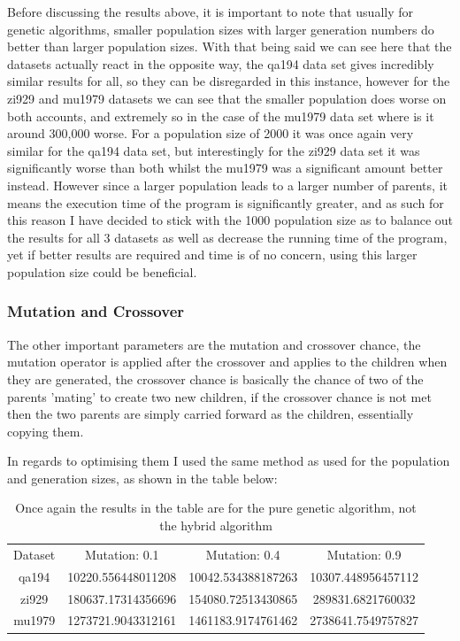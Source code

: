 \documentclass[11pt,a4paper,titlepage]{article}
\begin{document}
Before discussing the results above, it is important to note that usually for genetic algorithms, smaller population sizes with larger generation numbers do better than larger population sizes. With that being said we can see here that the datasets actually react in the opposite way, the qa194 data set gives incredibly similar results for all, so they can be disregarded in this instance, however for the zi929 and mu1979 datasets we can see that the smaller population does worse on both accounts, and extremely so in the case of the mu1979 data set where is it around 300,000 worse. For a population size of 2000 it was once again very similar for the qa194 data set, but interestingly for the zi929 data set it was significantly worse than both whilst the mu1979 was a significant amount better instead. However since a larger population leads to a larger number of parents, it means the execution time of the program is significantly greater, and as such for this reason I have decided to stick with the 1000 population size as to balance out the results for all 3 datasets as well as decrease the running time of the program, yet if better results are required and time is of no concern, using this larger population size could be beneficial.

\subsubsection{Mutation and Crossover}

The other important parameters are the mutation and crossover chance, the mutation operator is applied after the crossover and applies to the children when they are generated, the crossover chance is basically the chance of two of the parents 'mating' to create two new children, if the crossover chance is not met then the two parents are simply carried forward as the children, essentially copying them.

\pagebreak

In regards to optimising them I used the same method as used for the population and generation sizes, as shown in the table below:

\begin{table}[h]
\centering
\begin{tabular}{c | c | c | c}
Dataset & Mutation: 0.1 & Mutation: 0.4 & Mutation: 0.9 \\ [0.5ex]
\Xhline{1.5pt}
	qa194 & 10220.556448011208 & 10042.534388187263 & 10307.448956457112 \\
\hline
	zi929 & 180637.17314356696 & 154080.72513430865 & 289831.6821760032 \\
\hline
	mu1979 & 1273721.9043312161 & 1461183.9174761462 & 2738641.7549757827

\end{tabular}
\caption{Once again the results in the table are for the pure genetic algorithm, not the hybrid algorithm}
\end{table}
\end{document}

